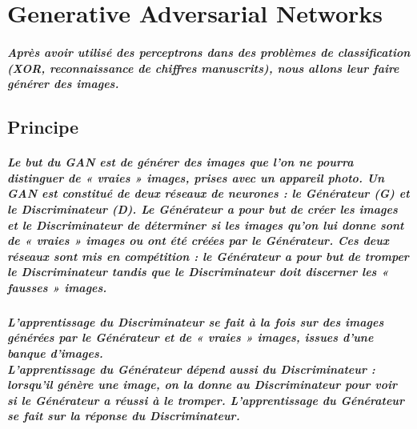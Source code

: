 


\chapter{Generative Adversarial Networks}

\paragraph{Après avoir utilisé des perceptrons dans des problèmes de classification (XOR, reconnaissance de chiffres manuscrits), nous allons leur faire générer des images.}

\section{Principe}
\paragraph{Le but du GAN est de générer des images que l’on ne pourra distinguer de « vraies » images, prises avec un appareil photo. Un GAN est constitué de deux réseaux de neurones : le Générateur (G) et le Discriminateur (D). Le Générateur a pour but de créer les images et le Discriminateur de déterminer si les images qu’on lui donne sont de « vraies » images ou ont été créées par le Générateur. Ces deux réseaux sont mis en compétition : le Générateur a pour but de tromper le Discriminateur tandis que le Discriminateur doit discerner les « fausses » images. }

\paragraph{L’apprentissage du Discriminateur se fait à la fois sur des images générées par le Générateur et de « vraies » images, issues d’une banque d’images.\\
L’apprentissage du Générateur dépend aussi du Discriminateur : lorsqu’il génère une image, on la donne au Discriminateur pour voir si le Générateur a réussi à le tromper. L’apprentissage du Générateur se fait sur la réponse du Discriminateur.}

